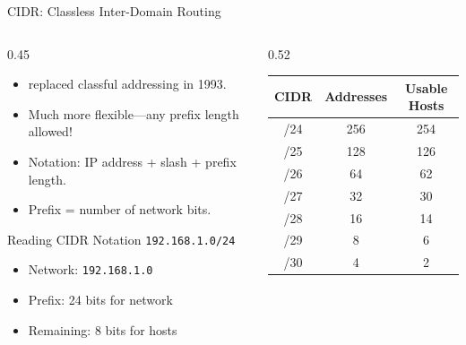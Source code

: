 \documentclass[aspectratio=169]{beamer}  %
\begin{document}
\begin{frame}{CIDR: Classless Inter-Domain Routing}
    \begin{columns}[T]
        \begin{column}{0.45\textwidth}
            \begin{itemize}
                \item {} replaced classful addressing in 1993.
                \item Much more flexible---any prefix length allowed!
                \item Notation: IP address + slash + prefix length.
                \item Prefix = number of network bits.
            \end{itemize}
            
            \vspace{0.3em}
            \begin{exampleblock}{Reading CIDR Notation}
                \texttt{192.168.1.0/24}
                
                \vspace{0.2em}
                \begin{itemize}
                    \item Network: \texttt{192.168.1.0}
                    \item Prefix: 24 bits for network
                    \item Remaining: 8 bits for hosts
                \end{itemize}
            \end{exampleblock}
        \end{column}
        \begin{column}{0.52\textwidth}
            \begin{center}
                \small
                \begin{tabular}{c c c}
                    \toprule
                    \textbf{CIDR} & \textbf{Addresses} & \textbf{Usable Hosts} \\
                    \midrule
                    /24 & 256 & 254 \\
                    /25 & 128 & 126 \\
                    /26 & 64 & 62 \\
                    /27 & 32 & 30 \\
                    /28 & 16 & 14 \\
                    /29 & 8 & 6 \\
                    /30 & 4 & 2 \\
                    \bottomrule
                \end{tabular}
            \end{center}
            

\end{column}
\end{columns}
\end{frame}
\end{document}
